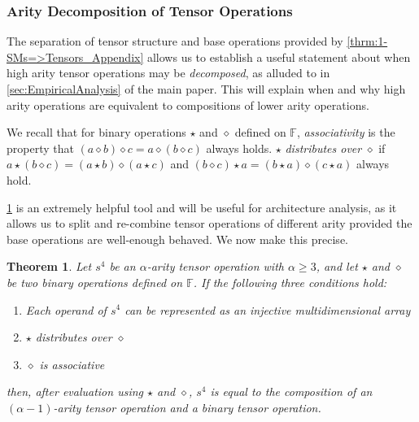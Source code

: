 \documentclass{article}
\theoremstyle{plain}
\newtheorem{theorem}{Theorem}[section]
\theoremstyle{definition}
\theoremstyle{remark}
\begin{document}
\clearpage
\subsubsection{\label{sec:TensorOps_Decomp}Arity Decomposition of Tensor Operations\label{sec:ArityDecomp}}
The separation of tensor structure and base operations provided by \cref{thrm:1-SMs=>Tensors_Appendix} allows us to establish a useful statement about when high arity tensor operations may be \textit{decomposed}, as alluded to in \cref{sec:EmpiricalAnalysis} of the main paper. This will explain when and why high arity operations are equivalent to compositions of lower arity operations.

We recall that for binary operations $\star$ and $\diamond$ defined on $\mathbb{F}$, \textit{associativity} is the property that $(a \diamond b) \diamond c = a \diamond (b \diamond c)$ always holds. $\star$ \textit{distributes over} $\diamond$ if $a \star (b \diamond c) = (a \star b) \diamond (a \star c)$ and  $(b \diamond c) \star a = (b \star a) \diamond (c \star a)$ always hold.

\cref{thrm:ArityDecomp} is an extremely helpful tool and will be useful for architecture analysis, as it allows us to split and re-combine tensor operations of different arity provided the base operations are well-enough behaved. We now make this precise.
\begin{theorem}
	Let $s^4$ be an $\alpha$-arity tensor operation with $\alpha \geq 3$, and let $\star$ and $\diamond$ be two binary operations defined on $\mathbb{F}$. If the following three conditions hold:
	\begin{enumerate}
		\item Each operand of $s^4$ can be represented as an injective multidimensional array
		\item $\star$ distributes over $\diamond$
		\item $\diamond$ is associative
	\end{enumerate}
	then, after evaluation using $\star$ and $\diamond$, $s^4$ is equal to the composition of an $(\alpha - 1)$-arity tensor operation and a binary tensor operation.
	\label{thrm:ArityDecomp}
\end{theorem}
\end{document}
